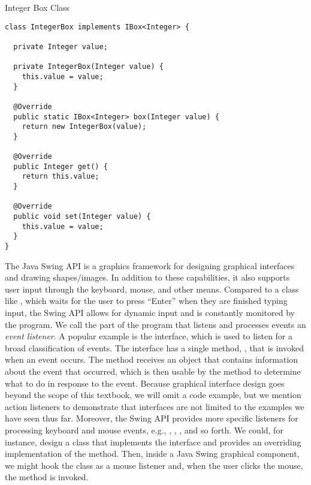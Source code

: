 \begin{cl}[]{Integer Box Class}
\begin{lstlisting}[language=MyJava]
class IntegerBox implements IBox<Integer> {
  
  private Integer value;
  
  private IntegerBox(Integer value) { 
    this.value = value; 
  }
  
  @Override
  public static IBox<Integer> box(Integer value) { 
    return new IntegerBox(value); 
  }
  
  @Override
  public Integer get() { 
    return this.value; 
  }
  
  @Override
  public void set(Integer value) { 
    this.value = value; 
  }
}
\end{lstlisting}
\end{cl}

The Java Swing API is a graphics framework for designing graphical interfaces and drawing shapes/images. In addition to these capabilities, it also supports user input through the keyboard, mouse, and other means. Compared to a class like , which waits for the user to press ``Enter'' when they are finished typing input, the Swing API allows for dynamic input and is constantly monitored by the program. We call the part of the program that listens and processes events an \textit{event listener}. A popular example is the  interface, which is used to listen for a broad classification of events. The  interface has a single method, , that is invoked when an event occurs. The  method receives an  object that contains information about the event that occurred, which is then usable by the method to determine what to do in response to the event. Because graphical interface design goes beyond the scope of this textbook, we will omit a code example, but we mention action listeners to demonstrate that interfaces are not limited to the examples we have seen thus far. Moreover, the Swing API provides more specific listeners for processing keyboard and mouse events, e.g., , , , and so forth. We could, for instance, design a class that implements the  interface and provides an overriding implementation of the  method. Then, inside a Java Swing graphical component, we might hook the class as a mouse listener and, when the user clicks the mouse, the  method is invoked.

